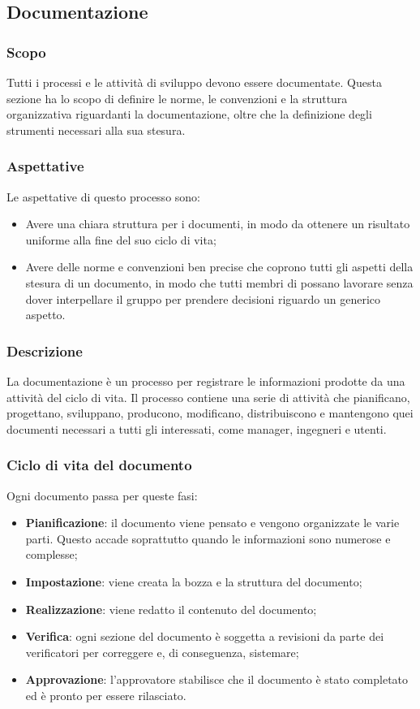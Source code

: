 \subsection{Documentazione}
\subsubsection{Scopo}
Tutti i processi e le attività di sviluppo devono essere documentate. Questa sezione ha lo scopo di definire le norme, le convenzioni e la struttura organizzativa riguardanti la documentazione, oltre che la definizione degli strumenti necessari alla sua stesura.
\subsubsection{Aspettative}
Le aspettative di questo processo sono:
\begin{itemize}
	\item Avere una chiara struttura per i documenti, in modo da ottenere un risultato uniforme alla fine del suo ciclo di vita;	
	\item Avere delle norme e convenzioni ben precise che coprono tutti gli aspetti della stesura di un documento, in modo che tutti membri di \Gruppo{} possano lavorare senza dover interpellare il gruppo per prendere decisioni riguardo un generico aspetto.
\end{itemize}
\subsubsection{Descrizione}
La documentazione è un processo per registrare le informazioni prodotte da una attività del ciclo di vita. Il processo contiene una serie di attività che pianificano, progettano, sviluppano, producono, modificano, distribuiscono e mantengono quei documenti necessari a tutti gli interessati, come manager, ingegneri e utenti.
\subsubsection{Ciclo di vita del documento}
Ogni documento passa per queste fasi:
\begin{itemize}

	\item \textbf{Pianificazione}: il documento viene pensato e vengono organizzate le varie parti. Questo accade soprattutto quando le informazioni sono numerose e complesse;
	
	\item \textbf{Impostazione}: viene creata la bozza e la struttura del documento;
	
	\item \textbf{Realizzazione}: viene redatto il contenuto del documento;
	
	\item \textbf{Verifica}: ogni sezione del documento è soggetta a revisioni da parte dei verificatori per correggere e, di conseguenza, sistemare;
	
	\item \textbf{Approvazione}: l'approvatore stabilisce che il documento è stato completato ed è pronto per essere rilasciato.
	
\end{itemize}
